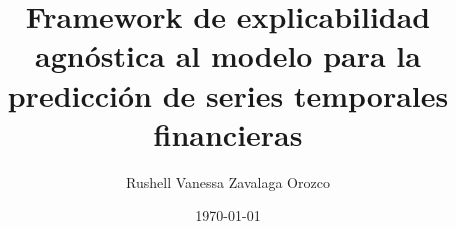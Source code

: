 \documentclass[11pt,openright,final]{unsa}
\title{Framework de explicabilidad agnóstica al modelo para la predicción de series temporales financieras}
\author{Rushell Vanessa Zavalaga Orozco}%
\date{\today}
\begin{document}
\makeFirstCover
\makeSecondCover %
\begin{frontmatter}
\approved{\tres}%
\dedicatory
\begin{singlespace}
\tableofcontents \listoftables \pagebreak
\end{singlespace}
%
%
%
\end{frontmatter}%
\pagestyle{fancyplain}






\begin{singlespace}
\end{singlespace}
\end{document}
